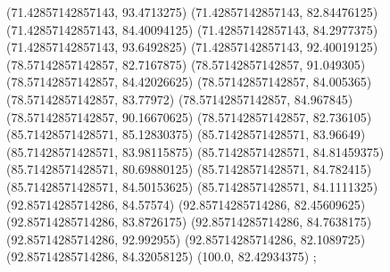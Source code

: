 {{{		(71.42857142857143, 93.4713275)
		(71.42857142857143, 82.84476125)
		(71.42857142857143, 84.40094125)
		(71.42857142857143, 84.2977375)
		(71.42857142857143, 93.6492825)
		(71.42857142857143, 92.40019125)
		(78.57142857142857, 82.7167875)
		(78.57142857142857, 91.049305)
		(78.57142857142857, 84.42026625)
		(78.57142857142857, 84.005365)
		(78.57142857142857, 83.77972)
		(78.57142857142857, 84.967845)
		(78.57142857142857, 90.16670625)
		(78.57142857142857, 82.736105)
		(85.71428571428571, 85.12830375)
		(85.71428571428571, 83.96649)
		(85.71428571428571, 83.98115875)
		(85.71428571428571, 84.81459375)
		(85.71428571428571, 80.69880125)
		(85.71428571428571, 84.782415)
		(85.71428571428571, 84.50153625)
		(85.71428571428571, 84.1111325)
		(92.85714285714286, 84.57574)
		(92.85714285714286, 82.45609625)
		(92.85714285714286, 83.8726175)
		(92.85714285714286, 84.7638175)
		(92.85714285714286, 92.992955)
		(92.85714285714286, 82.1089725)
		(92.85714285714286, 84.32058125)
		(100.0, 82.42934375)
	};

}}
